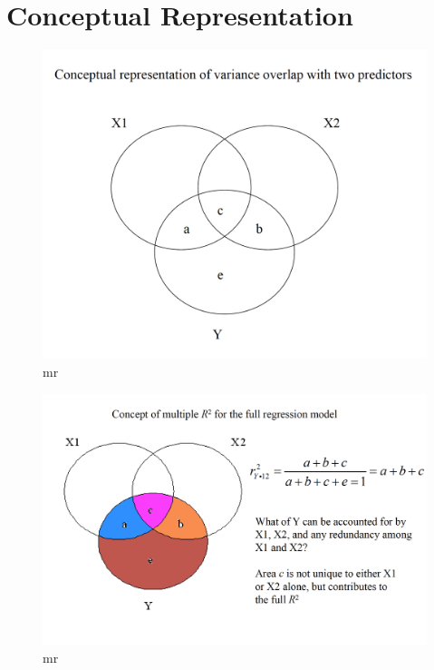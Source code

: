 \documentclass[]{book}
\theoremstyle{definition}
\theoremstyle{definition}
\theoremstyle{definition}
\theoremstyle{remark}
\begin{document}
\section{Conceptual Representation}\label{conceptual-representation}

\begin{figure}
\centering
\includegraphics{img/hicksmr13.png}
\caption{mr}
\end{figure}

\begin{figure}
\centering
\includegraphics{img/hicksmr14.png}
\caption{mr}
\end{figure}
\end{document}
